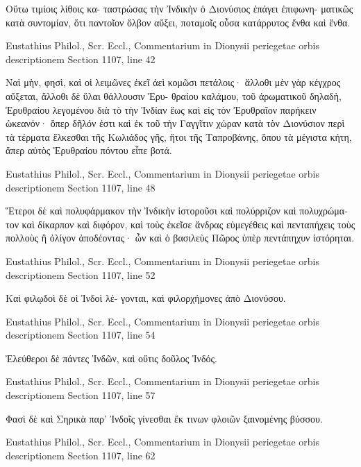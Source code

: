 \documentclass[12pt,letterpaper,twoside,final]{memoir}
\begin{document}
\begin{greek}
                              Οὕτω τιμίοις λίθοις κα-
ταστρώσας τὴν Ἰνδικὴν ὁ Διονύσιος ἐπάγει ἐπιφωνη-
ματικῶς κατὰ συντομίαν, ὅτι παντοῖον ὄλβον αὔξει, 
ποταμοῖς οὖσα κατάρρυτος ἔνθα καὶ ἔνθα. 



Eustathius Philol., Scr. Eccl., Commentarium in Dionysii periegetae orbis descriptionem 
Section 1107, line 42

                                                 Ναὶ μὴν, φησὶ, 
καὶ οἱ λειμῶνες ἐκεῖ ἀεὶ κομῶσι πετάλοις· ἄλλοθι μὲν 
γὰρ κέγχρος αὔξεται, ἄλλοθι δὲ ὕλαι θάλλουσιν Ἐρυ-
θραίου καλάμου, τοῦ ἀρωματικοῦ δηλαδὴ, Ἐρυθραίου 
λεγομένου διὰ τὸ τὴν Ἰνδίαν ἕως καὶ εἰς τὸν Ἐρυθραῖον 
παρήκειν ὠκεανόν· ὅπερ δῆλόν ἐστι καὶ ἐκ τοῦ τὴν 
Γαγγῖτιν χώραν κατὰ τὸν Διονύσιον περὶ τὰ τέρματα 
ἕλκεσθαι τῆς Κωλιάδος γῆς, ἤτοι τῆς Ταπροβάνης, 
ὅπου τὰ μέγιστα κήτη, ἅπερ αὐτὸς Ἐρυθραίου πόντου 
εἶπε βοτά. 



Eustathius Philol., Scr. Eccl., Commentarium in Dionysii periegetae orbis descriptionem 
Section 1107, line 48

                                                Ἕτεροι δὲ καὶ 
πολυφάρμακον τὴν Ἰνδικὴν ἱστοροῦσι καὶ πολύρριζον 
καὶ πολυχρώματον καὶ δίκαρπον καὶ διφόρον, καὶ τοὺς 
ἐκεῖσε ἄνδρας εὐμεγέθεις καὶ πενταπήχεις τοὺς πολλοὺς 
ἢ ὀλίγον ἀποδέοντας· ὧν καὶ ὁ βασιλεὺς Πῶρος ὑπὲρ 
πεντάπηχυν ἱστόρηται. 



Eustathius Philol., Scr. Eccl., Commentarium in Dionysii periegetae orbis descriptionem 
Section 1107, line 52

                         Καὶ φιλῳδοὶ δὲ οἱ Ἰνδοὶ λέ-
γονται, καὶ φιλορχήμονες ἀπὸ Διονύσου. 



Eustathius Philol., Scr. Eccl., Commentarium in Dionysii periegetae orbis descriptionem 
Section 1107, line 54

                                             Ἐλεύθεροι δὲ 
πάντες Ἰνδῶν, καὶ οὔτις δοῦλος Ἰνδός. 



Eustathius Philol., Scr. Eccl., Commentarium in Dionysii periegetae orbis descriptionem 
Section 1107, line 57

                                Φασὶ δὲ καὶ Σηρικὰ παρ' 
Ἰνδοῖς γίνεσθαι ἔκ τινων φλοιῶν ξαινομένης βύσσου. 



Eustathius Philol., Scr. Eccl., Commentarium in Dionysii periegetae orbis descriptionem 
Section 1107, line 62


\end{greek}
\end{document}
